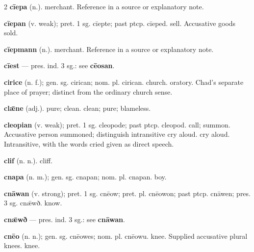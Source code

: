 \begin{multicols*}{2}
\textbf{cīepa} (n.). merchant. Reference in a source or explanatory note.\par
\textbf{cīepan} (v. weak); pret. 1 sg. cīepte; past ptcp. cīeped. sell. Accusative goods sold.\par
\textbf{cīepmann} (n.). merchant. Reference in a source or explanatory note.\par
\textbf{cīest} — pres. ind. 3 sg.: see \textbf{cēosan}.\par
\textbf{cirice} (n. f.); gen. sg. cirican; nom. pl. cirican. church. oratory. Chad's separate place of prayer; distinct from the ordinary church sense.\par
\textbf{clǣne} (adj.). pure; clean. clean; pure; blameless.\par
\textbf{cleopian} (v. weak); pret. 1 sg. cleopode; past ptcp. cleopod. call; summon. Accusative person summoned; distinguish intransitive cry aloud. cry aloud. Intransitive, with the words cried given as direct speech.\par
\textbf{clif} (n. n.). cliff.\par
\textbf{cnapa} (n. m.); gen. sg. cnapan; nom. pl. cnapan. boy.\par
\textbf{cnāwan} (v. strong); pret. 1 sg. cnēow; pret. pl. cnēowon; past ptcp. cnāwen; pres. 3 sg. cnǣwð. know.\par
\textbf{cnǣwð} — pres. ind. 3 sg.: see \textbf{cnāwan}.\par
\textbf{cnēo} (n. n.); gen. sg. cnēowes; nom. pl. cnēowu. knee. Supplied accusative plural knees. knee.\par

\end{multicols*}
